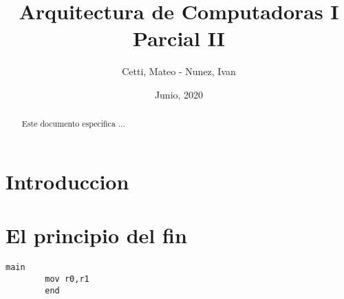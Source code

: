 \documentclass[12pt, letterpaper]{article}
\title{Arquitectura de Computadoras I \break Parcial II}
\author{Cetti, Mateo - Nunez, Ivan}
\date{Junio, 2020}
\begin{document}
\maketitle

\begin{abstract}
  Este documento especifica ...
\end{abstract}

\newpage

\tableofcontents

\newpage

\section{Introduccion}

\section{El principio del fin}



\begin{lstlisting}[style=customarm]
main
        mov r0,r1
        end
\end{lstlisting}
\end{document}
